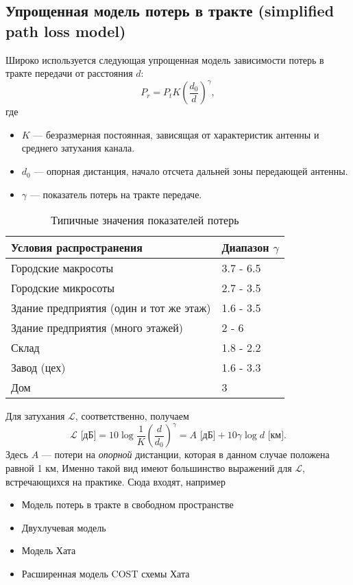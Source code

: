 \documentclass{book}
\numberwithin{theorem}{chapter}
\numberwithin{statement}{chapter}
\numberwithin{lemma}{chapter}
\theoremstyle{definition}
\numberwithin{task}{chapter}
\theoremstyle{remark}
\numberwithin{example}{chapter}
\theoremstyle{definition}
\numberwithin{definition}{chapter}
\theoremstyle{remark}
\theoremstyle{remark}
\numberwithin{lyrics}{section}
\begin{document}
\subsection{Упрощенная модель потерь в тракте (simplified path loss model)}
Широко используется следующая упрощенная модель зависимости потерь в тракте передачи от расстояния $d$:
\begin{equation*}
P_r = P_t K \left(\frac{d_0}{d}\right)^\gamma,
\end{equation*}
где 
\begin{itemize}
\item $K$ --- безразмерная постоянная, зависящая от характеристик антенны и среднего затухания канала.
\item $d_0$ --- опорная дистанция, начало отсчета дальней зоны передающей антенны.
\item $\gamma$ --- показатель потерь на тракте передаче.
\end{itemize}

\begin{table}
\begin{center}
\caption{\label{tab:phy:channel_models:path_loss}Типичные значения показателей потерь}
\begin{tabular}{|l|l|}
\hline
Условия распространения                  & Диапазон $\gamma$ \\ \hline
Городские макросоты                      & 3.7 - 6.5 \\ \hline
Городские микросоты                      & 2.7 - 3.5 \\ \hline
Здание предприятия (один и тот же этаж)  & 1.6 - 3.5 \\ \hline
Здание предприятия (много этажей)        & 2 - 6     \\ \hline
Склад                                    & 1.8 - 2.2 \\ \hline
Завод (цех)                              & 1.6 - 3.3 \\ \hline
Дом                                      & 3         \\ \hline
\end{tabular}
\end{center}
\end{table}

Для затухания $\mathcal{L}$, соответственно, получаем
\begin{equation*}
\mathcal{L} \text{ [дБ]} = 10 \log \frac{1}{K} \left(\frac{d}{d_0}\right)^{\gamma} = A \text{ [дБ]} + 10 \gamma \log d \text{ [км]}. 
\end{equation*}
Здесь $A$ --- потери на \textit{опорной} дистанции, которая в данном случае положена равной 1 км,
Именно такой вид имеют большинство выражений для  $\mathcal{L}$, встречающихся на практике. Сюда входят, например
\begin{itemize}
\item Модель потерь в тракте в свободном пространстве
\item Двухлучевая модель
\item Модель Хата
\item Расширенная модель COST схемы Хата
\end{itemize}
\end{document}
